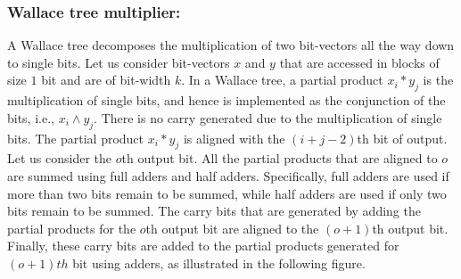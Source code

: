\vspace{-4ex}
\subsubsection{Wallace tree multiplier\cite{wallace}:}
%
A Wallace tree decomposes the multiplication of two bit-vectors all
the way down to single bits.
%
Let us consider bit-vectors $x$ and $y$ that are accessed in blocks of
size $1$ bit and are of bit-width $k$.
%
In a Wallace tree, a partial product $x_i*y_j$ is the multiplication
of single bits, and hence is implemented as the conjunction of the
bits, i.e., $x_i \land y_j$.
%
There is no carry generated due to the multiplication of single bits.
%
The partial product $x_i*y_j$ is aligned with the $(i+j-2)$th bit of output.
%
Let us consider the $o$th output bit.
%
All the partial products that are aligned to $o$ are summed using full adders 
and half adders.
%
Specifically, full adders are used if more than two bits remain to be
summed, while half adders are used if only two bits remain
to be summed.
%
The carry bits that are generated by adding the partial products for
the $o$th output bit are aligned to the $(o+1)$th output bit.
%
Finally, these carry bits are added to the partial products generated
for $(o+1)th$ bit using adders, as illustrated in the following figure.

\begin{center}
\end{center}


